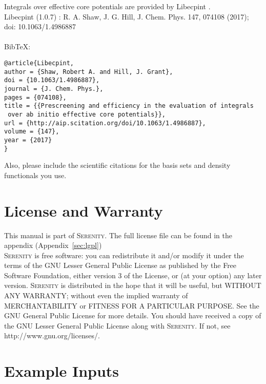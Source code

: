 \documentclass[bibliography=totocnumbered,a4paper,10pt,oneside]{scrbook}
\newcommand{
\serenity}{\textsc{Serenity}\xspace}
\begin{document}
\newpage
\noindent Integrals over effective core potentials are provided by Libecpint \cite{Libecpint}.\\
Libecpint (1.0.7) :  R. A. Shaw, J. G. Hill, J. Chem. Phys. 147, 074108 (2017); doi: 10.1063/1.4986887\\
\\
BibTeX:
\begin{lstlisting}
@article{Libecpint,
author = {Shaw, Robert A. and Hill, J. Grant},
doi = {10.1063/1.4986887},
journal = {J. Chem. Phys.},
pages = {074108},
title = {{Prescreening and efficiency in the evaluation of integrals
 over ab initio effective core potentials}},
url = {http://aip.scitation.org/doi/10.1063/1.4986887},
volume = {147},
year = {2017}
}
\end{lstlisting}

Also, please include the scientific citations for the basis sets and density functionals you use.

\chapter{License and Warranty}
This manual is part of \serenity. The full license file can be found in the appendix (Appendix~\ref{sec:lgpl})\\

\serenity is free software: you can redistribute it and/or modify it under
the terms of the GNU Lesser General Public License as published by the Free
Software Foundation, either version 3 of the License, or (at your option) any later version.
\serenity is distributed in the hope that it will be useful, but
WITHOUT ANY WARRANTY; without even the implied warranty of MERCHANTABILITY
or FITNESS FOR A PARTICULAR PURPOSE. See the GNU General Public License for more details.
You should have received a copy of the GNU Lesser General Public License along with
\serenity. If not, see http://www.gnu.org/licenses/.


\clearpage
\printbibliography

\clearpage
\appendix
\chapter{Example Inputs}
\end{document}
